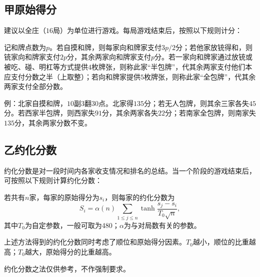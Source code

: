 \documentclass[UTF8]{article}
\newcommand{\q}{\quad}
\begin{document}
  \subsection*{甲\q 原始得分}
  建议以全庄（$16$局）为单位进行游戏。每局游戏结束后，按照以下规则计分：

  记和牌点数为$p$。若自摸和牌，则每家向和牌家支付$3p/2$分；若他家放铳得和，则铳家向和牌家支付$2p$分，其余两家向和牌家支付$p$分。若一家向和牌家通过放铳或被吃、碰、明杠等方式提供$4$枚牌张，则称此家“半包牌”，代其余两家支付他们本应支付分数之半（上取整）；若向和牌家提供$5$枚牌张，则称此家“全包牌”，代其余两家支付全部分数。
  
  例：北家自摸和牌，$10$副$3$翻$30$点。北家得$135$分；若无人包牌，则其余三家各失$45$分。若西家半包牌，则西家失$91$分，其余两家各失$22$分；若南家全包牌，则南家失$135$分，其余两家分数不变。

  \subsection*{乙\q 约化分数}
  约化分数是对一段时间内各家收支情况和排名的总结。当一个阶段的游戏结束后，可按照以下规则计算约化分数：

  若共有$n$家，每家的原始得分为$s_i$，则每家的约化分数为
  \[
  S_i = \alpha(n)\sum_{1\leq j\leq n}\tanh\frac{s_j-s_i}{T_0\sqrt{n}},
  \]
  其中$T_0$为自定参数，一般可取为480；$\alpha$为与对局数有关的参数。

  上述方法得到的约化分数同时考虑了顺位和原始得分因素。$T_0$越小，顺位的比重越高；$T_0$越大，原始得分的比重越高。

  约化分数之法仅供参考，不作强制要求。
\end{document}
